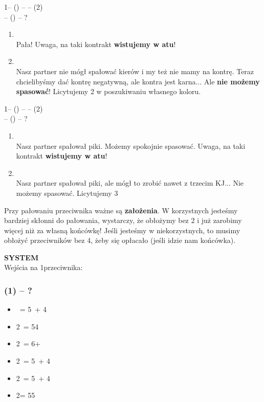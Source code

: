 \documentclass[12pt, a4paper]{article}
\begin{document}
1\nt -- (\alrts{2\clubs}) -- \dbl -- (2\hearts)\\
\pass -- (\pass) -- ?
\begin{enumerate}
    \item 
        \\
        Pała! Uwaga, na taki kontrakt \textbf{wistujemy w atu}!
    \item 
        \\
        Nasz partner nie mógł spałować kierów i my też nie mamy na kontrę.
        Teraz chcielibyśmy dać kontrę negatywną, ale kontra jest karna...
        Ale \textbf{nie możemy spasować}! Licytujemy 2\nt
        w poszukiwaniu własnego koloru.
\end{enumerate}

1\nt -- (\alrts{2\clubs}) -- \dbl -- (2\spades)\\
\dbl -- (\pass) -- ?
\begin{enumerate}
    \item 
        \\
        Nasz partner spałował piki. Możemy spokojnie
        spasować. Uwaga, na taki kontrakt \textbf{wistujemy w atu}!
    \item
        \\
        Nasz partner spałował piki, ale mógł to zrobić nawet z trzecim KJ...
        Nie możemy spasować. Licytujemy 3\clubs
\end{enumerate}

\begin{formal}
Przy pałowaniu przeciwnika ważne są \textbf{założenia}. 
W korzystnych jesteśmy bardziej skłonni do pałowania,
wystarczy, że obłożymy bez 2 i już zarobimy więcej niż za
własną końcówkę! Jeśli jesteśmy w niekorzystnych, to musimy
obłożyć przeciwników bez 4, żeby się opłacało (jeśli idzie nam końcówka).
\end{formal}

\newpage

\textbf{{\color{red}S}{\color{orange}Y}{\color{LimeGreen}S}{\color{cyan}T}{\color{blue}E}{\color{purple}M}}\\

Wejścia na 1\nt przeciwnika:

\subsubsection*{(1\ntx) -- ?}
\begin{itemize}
    \item \dbl\ = 5\minor\ + 4\major
    \item 2\clubs\ = 54 \major
    \item 2\diams\ = 6+ \major
    \item 2\hearts\ = 5\hearts\ + 4\minor
    \item 2\spades\ = 5\spades\ + 4\minor
    \item 2\nt = 55 \minor
\end{itemize}
\end{document}
